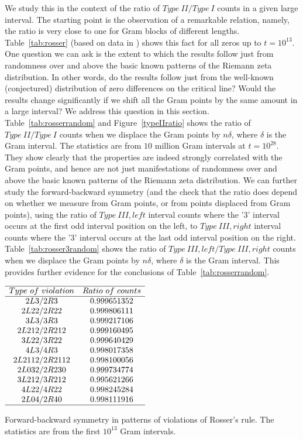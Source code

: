 \documentclass[twoside]{article}
\begin{document}
We study this in the context of the ratio of $Type~II/Type~I$ counts in a given large interval. The starting point is the observation of a remarkable relation, namely, the ratio is very close to one for Gram blocks of different lengths.   Table~\ref{tab:rosser}  (based on data in \cite{gourdon}) shows this fact for all zeros up to $t = 10^{13}$. One question we can ask is the extent to which the results follow just from randomness over and above the basic known patterns of the Riemann zeta distribution. In other words, do the results follow just from the well-known (conjectured) distribution of zero differences on the critical line? Would the results change significantly if we shift all the Gram points  by the same amount in a large interval? We address this question in this section. Table~\ref{tab:rosserrandom} and Figure~\ref{typeIIratio} shows the ratio of $Type~II/Type~I$ counts when we displace the Gram points by $n\delta$, where $\delta$ is the Gram interval. The statistics are from $10$ million Gram intervals at $t=10^{28}$.
They  show clearly that the properties are indeed strongly correlated with the Gram points, and hence are not just manifestations of randomness over and above the basic known patterns of the Riemann zeta distribution. 
We can further study the forward-backward symmetry (and the check that the ratio does depend on whether we measure from Gram points, or from points displaced from Gram points), using the ratio of  $Type~III,left$ interval counts where the '3' interval occurs at the first odd interval position on the left, to  $Type~III,right$ interval counts where the '3' interval occurs at the last odd interval position on the right. 
Table~\ref{tab:rosser3random} shows the ratio of $Type~III,left/Type~III,right$ counts when we displace the Gram points by $n\delta$, where $\delta$ is the Gram interval. This provides further evidence for the conclusions of Table~\ref{tab:rosserrandom}.
  
\begin{table}
\centering \(\begin{array}{cc}
\hline
Type~of~violation &Ratio~of~counts\\
\hline
2L3/2R3 &0.999651352\\
2L22/2R22 &0.999806111\\
3L3/3R3 &0.999217106\\
2L212/2R212 &0.999160495\\
3L22/3R22 &0.999640429\\
4L3/4R3 &0.998017358\\
2L2112/2R2112 &0.998100056\\
2L032/2R230 &0.999734774\\
3L212/3R212 &0.995621266\\
4L22/4R22 &0.998245284\\
2L04/2R40 &0.998111916\\
\hline
\end{array}\)
\caption{Forward-backward symmetry in patterns of violations of Rosser's rule.  The statistics are from the first $10^{13}$ Gram intervals.} \label{tab:vrr}
\end{table}
\end{document}
